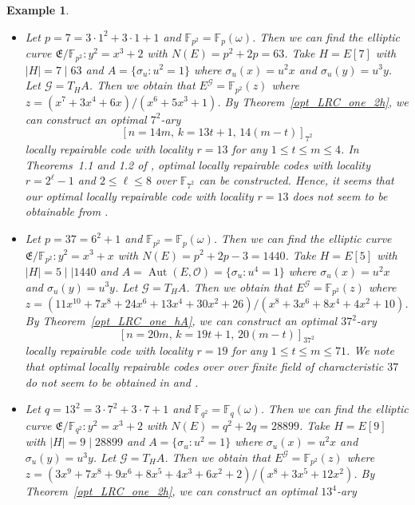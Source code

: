 \documentclass[journal,12pt,onecolumn]{IEEEtran}
\newtheorem{example}{Example}
\begin{document}
\begin{example}\label{opt_lrc_one_ex}
    \begin{itemize}
        \item[(i)] Let \(p=7 = 3\cdot 1^2 + 3\cdot 1 + 1\) and \(\mathbb{F}_{p^2} = \mathbb{F}_p(\omega)\). Then we can find the elliptic curve \(\mathfrak{E}/\mathbb{F}_{p^2}:y^2 = x^3 + 2\) with \(N(E) = p^2 + 2p = 63\). Take \(H = E[7]\) with \(|H| = 7\mid 63\) and \(A = \{\sigma_u:u^2 = 1\}\) where \(\sigma_u(x) = u^2x\) and \(\sigma_u(y) = u^3y\). Let \(\mathcal{G} = T_HA\). Then we obtain that \(E^{\mathcal{G}} = \mathbb{F}_{p^2}(z)\) where \(z = (x^7 + 3x^4 + 6x)/(x^6 + 5x^3 + 1)\). By Theorem~\ref{opt_LRC_one_2h}, we can construct an optimal \(7^2\)-ary 
        \[
            [n=14m,\,k=13t+1,\,14(m-t)]_{7^2}
        \]
        locally repairable code with locality \(r = 13\) for any \(1\le t\le m\le4\). In Theorems~1.1 and 1.2 of \cite{MA2023105686}, optimal locally repairable codes with locality \(r = 2^\ell-1\) and \(2\le\ell\le8\) over \(\mathbb{F}_{7^2}\) can be constructed. Hence, it seems that our optimal locally repairable code with locality \(r = 13\) does not seem to be obtainable from \cite{MA2023105686}.
        \item[(ii)] Let \(p=37 = 6^2 + 1\) and \(\mathbb{F}_{p^2} = \mathbb{F}_p(\omega)\). Then we can find the elliptic curve \(\mathfrak{E}/\mathbb{F}_{p^2}:y^2 = x^3 + x\) with \(N(E) = p^2 + 2p - 3 = 1440\). Take \(H = E[5]\) with \(|H| = 5\mid\mid 1440\) and \(A = \operatorname{Aut}(E, \mathcal{O}) = \{\sigma_u:u^4 = 1\}\) where \(\sigma_u(x) = u^2x\) and \(\sigma_u(y) = u^3y\). Let \(\mathcal{G} = T_HA\). Then we obtain that \(E^{\mathcal{G}} = \mathbb{F}_{p^2}(z)\) where \(z = (11x^{10} + 7x^8 + 24x^6 + 13x^4 + 30x^2 + 26)/(x^8 + 3x^6 + 8x^4 + 4x^2 + 10)\). By Theorem~\ref{opt_LRC_one_hA}, we can construct an optimal \(37^2\)-ary 
        \[
            [n=20m,\,k=19t+1,\,20(m-t)]_{37^2}
        \]
        locally repairable code with locality \(r = 19\) for any \(1\le t\le m\le71\). We note that optimal locally repairable codes over over finite field of characteristic \(37\) do not seem to be obtained in \cite{Optimal_Locally_Repairable_Codes_Via_Elliptic_Curves} and \cite{MA2023105686}.
        \item[(iii)] Let \(q=13^2 = 3\cdot7^2 + 3\cdot 7+1\) and \(\mathbb{F}_{q^2} = \mathbb{F}_q(\omega)\). Then we can find the elliptic curve \(\mathfrak{E}/\mathbb{F}_{q^2}:y^2 = x^3 + 2\) with \(N(E) = q^2 + 2q = 28899\). Take \(H = E[9]\) with \(|H| = 9\mid 28899\) and \(A = \{\sigma_u:u^2 = 1\}\) where \(\sigma_u(x) = u^2x\) and \(\sigma_u(y) = u^3y\). Let \(\mathcal{G} = T_HA\). Then we obtain that \(E^{\mathcal{G}} = \mathbb{F}_{p^2}(z)\) where \(z = (3x^9 + 7x^8 + 9x^6 + 8x^5 + 4x^3 + 6x^2 + 2)/(x^8 + 3x^5 + 12x^2)\). By Theorem~\ref{opt_LRC_one_2h}, we can construct an optimal \(13^4\)-ary 

\end{itemize}
\end{example}
\end{document}

